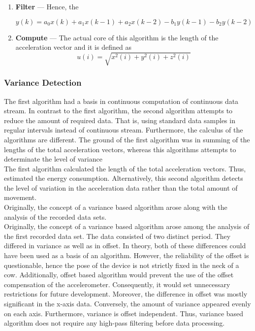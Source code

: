 \documentclass[english,12pt,a4paper,pdftex,elec,utf8]{aaltothesis}
\begin{document}
\begin{enumerate}
\item \textbf{Filter} --- Hence, the 

\begin{equation}
y(k) = a_0 x(k) + a_1 x(k-1) + a_2 x(k-2) - b_1 y(k-1) - b_2 y(k-2)
\end{equation}

\item \textbf{Compute} --- The actual core of this algorithm is the length of the acceleration vector and it is defined as \begin{equation}
u(i) = \sqrt{x^2(i) + y^2(i) + z^2(i)} 
\end{equation}

\end{enumerate}


\subsubsection{Variance Detection} \label{variancedetectionsection}

The first algorithm had a basis in continuous computation of continuous data stream. In contrast to the first algorithm, the second algorithm attempts to reduce the amount of required data. That is, using standard data samples in regular intervals instead of continuous stream. Furthermore, the calculus of the algorithms are different. The ground of the first algorithm was in summing of the lengths of the total acceleration vectors, whereas this algorithms attempts to determinate the level of variance \\


The first algorithm calculated the length of the total acceleration vectors. Thus, estimated the energy consumption. Alternatively, this second algorithm detects the level of variation in the acceleration data rather than the total amount of movement. \\

Originally, the concept of a variance based algorithm arose along with the analysis of the recorded data sets.  \\


Originally, the concept of a variance based algorithm arose among the analysis of the first recorded data set. The data consisted of two distinct period. They differed in variance as well as in offset. In theory, both of these differences could have been used as a basis of an algorithm. However, the reliability of the offset is questionable, hence the pose of the device is not strictly fixed in the neck of a cow. Additionally, offset based algorithm would prevent the use of the offset compensation of the accelerometer. Consequently, it would set unnecessary restrictions for future development. Moreover, the difference in offset was mostly significant in the x-axis data. Conversely, the amount of variance appeared evenly on each axis. Furthermore, variance is offset independent. Thus, variance based algorithm does not require any high-pass filtering before data processing. \\
\end{document}
